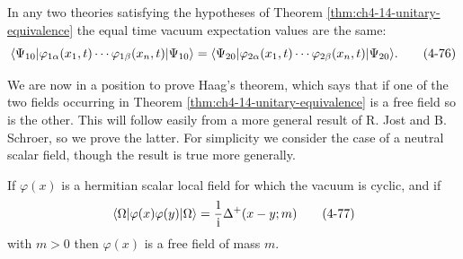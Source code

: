 \begin{corollary*}

In any two theories satisfying the hypotheses of Theorem \ref{thm:ch4-14-unitary-equivalence} the equal time
vacuum expectation values are the same:
\begin{equation}
  \langle \Psi_{10}\rvert\varphi_{1\alpha}(x_1,t)\cdots
  \varphi_{1\beta}(x_n,t)\lvert \Psi_{10}\rangle
  =
  \langle \Psi_{20}\rvert\varphi_{2\alpha}(x_1,t)\cdots
  \varphi_{2\beta}(x_n,t)\lvert \Psi_{20}\rangle.
  \tag{4-76}\label{eq:ch4-equal-time-vacuum}
\end{equation}
\end{corollary*}

We are now in a position to prove Haag's theorem, which says that if one of
the two fields occurring in Theorem \ref{thm:ch4-14-unitary-equivalence} is a free field so is the other.
This will follow easily from a more general result of R. Jost and B. Schroer,
so we prove the latter.  For simplicity we consider the case of a neutral
scalar field, though the result is true more generally.

\begin{theorem}[4-15]\label{thm:ch4-15-jost-schroer}
If $\varphi(x)$ is a hermitian scalar local field for which the vacuum is
cyclic, and if
\begin{equation}
  \langle \Omega\rvert\varphi(x)\varphi(y)\lvert \Omega\rangle
  =\frac{1}{\mathrm{i}}\Delta^+(x-y;m)
  \tag{4-77}\label{eq:ch4-jost-schroer-two-point}
\end{equation}
with $m>0$ then $\varphi(x)$ is a free field of mass $m$.
\end{theorem}

